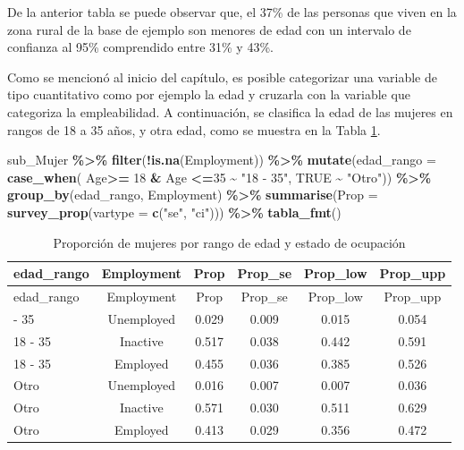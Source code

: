 \documentclass[
  spanish,
  12pt,
]{book}
\newenvironment{Shaded}{\begin{snugshade}}{\end{snugshade}}
\newcommand{\AttributeTok}[1]{\textcolor[rgb]{0.13,0.29,0.53}{#1}}
\newcommand{\ConstantTok}[1]{\textcolor[rgb]{0.56,0.35,0.01}{#1}}
\newcommand{\DecValTok}[1]{\textcolor[rgb]{0.00,0.00,0.81}{#1}}
\newcommand{\FunctionTok}[1]{\textcolor[rgb]{0.13,0.29,0.53}{\textbf{#1}}}
\newcommand{\NormalTok}[1]{#1}
\newcommand{\SpecialCharTok}[1]{\textcolor[rgb]{0.81,0.36,0.00}{\textbf{#1}}}
\newcommand{\StringTok}[1]{\textcolor[rgb]{0.31,0.60,0.02}{#1}}
\begin{document}
De la anterior tabla se puede observar que, el 37\% de las personas que viven en la zona rural de la base de ejemplo son menores de edad con un intervalo de confianza al 95\% comprendido entre 31\% y 43\%.

Como se mencionó al inicio del capítulo, es posible categorizar una variable de tipo cuantitativo como por ejemplo la edad y cruzarla con la variable que categoriza la empleabilidad. A continuación, se clasifica la edad de las mujeres en rangos de 18 a 35 años, y otra edad, como se muestra en la Tabla \ref{tab:tab-prop-edad-rango-empleo-mujer}.

\begin{Shaded}
\begin{Highlighting}[]
\NormalTok{sub\_Mujer }\SpecialCharTok{\%\textgreater{}\%} 
  \FunctionTok{filter}\NormalTok{(}\SpecialCharTok{!}\FunctionTok{is.na}\NormalTok{(Employment)) }\SpecialCharTok{\%\textgreater{}\%} 
  \FunctionTok{mutate}\NormalTok{(}\AttributeTok{edad\_rango =} \FunctionTok{case\_when}\NormalTok{(}
\NormalTok{                      Age}\SpecialCharTok{\textgreater{}=} \DecValTok{18} \SpecialCharTok{\&}\NormalTok{ Age }\SpecialCharTok{\textless{}=}\DecValTok{35}  \SpecialCharTok{\textasciitilde{}} \StringTok{"18 {-} 35"}\NormalTok{, }
                      \ConstantTok{TRUE} \SpecialCharTok{\textasciitilde{}} \StringTok{"Otro"}\NormalTok{)) }\SpecialCharTok{\%\textgreater{}\%}
  \FunctionTok{group\_by}\NormalTok{(edad\_rango, Employment) }\SpecialCharTok{\%\textgreater{}\%} 
  \FunctionTok{summarise}\NormalTok{(}\AttributeTok{Prop =} \FunctionTok{survey\_prop}\NormalTok{(}\AttributeTok{vartype =}  \FunctionTok{c}\NormalTok{(}\StringTok{"se"}\NormalTok{, }\StringTok{"ci"}\NormalTok{))) }\SpecialCharTok{\%\textgreater{}\%}
  \FunctionTok{tabla\_fmt}\NormalTok{()}
\end{Highlighting}
\end{Shaded}

\begin{longtable}[]{@{}lccccc@{}}
\caption{\label{tab:tab-prop-edad-rango-empleo-mujer}Proporción de mujeres por rango de edad y estado de ocupación}\tabularnewline
\toprule\noalign{}
edad\_rango & Employment & Prop & Prop\_se & Prop\_low & Prop\_upp \\
\midrule\noalign{}
\endfirsthead
\toprule\noalign{}
edad\_rango & Employment & Prop & Prop\_se & Prop\_low & Prop\_upp \\
\midrule\noalign{}
\endhead
\bottomrule\noalign{}
\endlastfoot
18 - 35 & Unemployed & 0.029 & 0.009 & 0.015 & 0.054 \\
18 - 35 & Inactive & 0.517 & 0.038 & 0.442 & 0.591 \\
18 - 35 & Employed & 0.455 & 0.036 & 0.385 & 0.526 \\
Otro & Unemployed & 0.016 & 0.007 & 0.007 & 0.036 \\
Otro & Inactive & 0.571 & 0.030 & 0.511 & 0.629 \\
Otro & Employed & 0.413 & 0.029 & 0.356 & 0.472 \\
\end{longtable}
\end{document}
